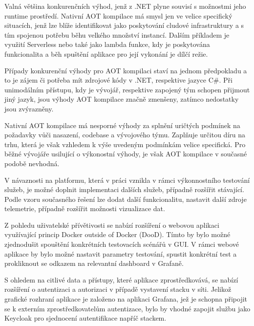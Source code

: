 Valná většina konkurenčních výhod, jenž z .NET plyne souvisí s možnostmi jeho runtime prostředí. Nativní AOT kompilace má smysl jen ve velice specifický situacích, jenž lze blíže identifikovat jako poskytování cludové infrastruktury a s tím spojenou potřebu běhu velkého množství instancí. Dalším příkladem je využití Serverless nebo také jako lambda funkce, kdy je poskytována funkcionalita a běh spuštění aplikace pro její vykonání je dílčí režie.

Případy konkurenční výhody pro AOT kompilaci staví na jednom předpokladu a to je zájem či potřeba mít zdrojové kódy v .NET, respektive jazyce C\#. Při unimodálním přístupu, kdy je vývojář, respektive zapojený tým schopen přijmout jiný jazyk, jsou výhody AOT kompilace značně zmenšeny, zatímco nedostatky jsou zvýrazněny.

Nativní AOT kompilace má nesporné výhody za splnění uričtých podmínek na požadavky vůči nasazení, codebase a vývojového týmu. Zaplňuje určitou díru na trhu, která je však vzhledem k výše uvedeným podmínkám velice specifická. Pro běžné vývojáře usilující o výkonostní výhody, je však AOT kompilace v současné podobě nevhodná.


V návaznosti na platformu, která v práci vznikla v rámci výkonnostního testování služeb, je možné doplnit implementaci dalších služeb, případně rozšířit stávající. Podle vzoru současného řešení lze dodat další funkcionalitu, nastavit další zdroje telemetrie, případně rozšířit možnosti vizualizace dat.

Z pohledu uživatelské přívětivosti se nabízí rozšíření o webovou aplikaci využívající princip Docker outside of Docker (DooD). Tímto by bylo možné zjednodušit spouštění konkrétních testovacích scénářů v GUI. V rámci webové aplikace by bylo možné nastavit parametry testování, spustit konkrétní test a prokliknout se odkazem na relevantní dashboard v Grafaně. 

S ohledem na citlivé data a přístupy, které aplikace zprostředkovává, se nabízí rozšíření o autentizaci a autorizaci v případě vystavení stacku v síti. Jelikož grafické rozhraní aplikace je založeno na aplikaci Grafana, jež je schopna připojit se k externím zprostředkovatelům autentizace, bylo by vhodné zapojit službu jako Keycloak pro sjednocení autentifikace napříč stackem.